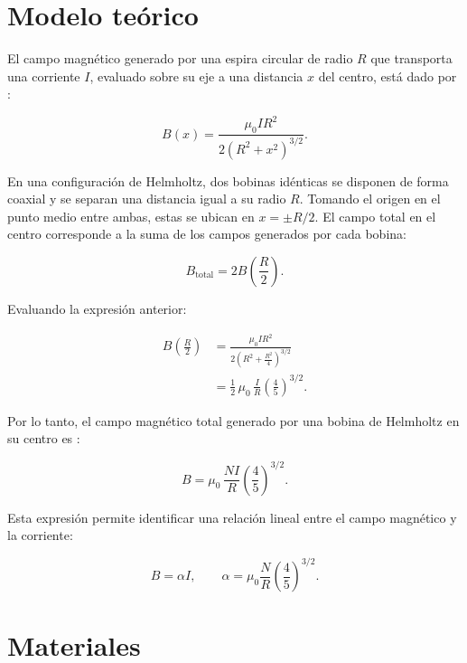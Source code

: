 \documentclass{article}
\begin{document}
\newpage

\section*{Modelo teórico}

El campo magnético generado por una espira circular de radio $R$ que transporta una corriente
$I$, evaluado sobre su eje a una distancia $x$ del centro, está dado por \cite{Griffiths}:

\begin{equation}
B(x) = \frac{\mu_0 I R^2}{2\left(R^2 + x^2\right)^{3/2}}.
\end{equation}

En una configuración de Helmholtz, dos bobinas idénticas se disponen de forma coaxial y se
separan una distancia igual a su radio $R$. Tomando el origen en el punto medio entre ambas,
estas se ubican en $x=\pm R/2$. El campo total en el centro corresponde a la suma de los
campos generados por cada bobina:

\begin{equation}
B_{\text{total}} = 2 B\left(\frac{R}{2}\right).
\end{equation}

Evaluando la expresión anterior:

\begin{align}
B\left(\frac{R}{2}\right)
&= \frac{\mu_0 I R^2}{2\left(R^2 + \frac{R^2}{4}\right)^{3/2}} \\
&= \frac{1}{2}\,\mu_0\,\frac{I}{R}\left(\frac{4}{5}\right)^{3/2}.
\end{align}

Por lo tanto, el campo magnético total generado por una bobina de Helmholtz en su centro es
\cite{bobinaHz}:

\begin{equation}
B = \mu_0\,\frac{N I}{R}\left(\frac{4}{5}\right)^{3/2}.
\end{equation}

Esta expresión permite identificar una relación lineal entre el campo magnético y la
corriente:

\begin{equation}
B = \alpha I,
\qquad
\alpha = \mu_0 \frac{N}{R}\left(\frac{4}{5}\right)^{3/2}.
\label{eq:alpha}
\end{equation}

\section*{Materiales}
\end{document}
